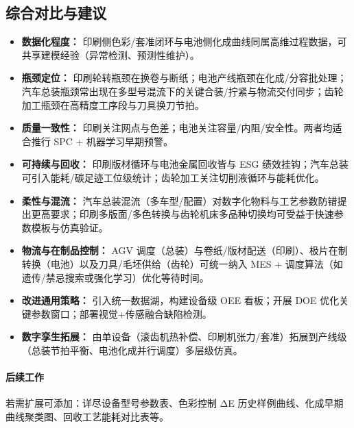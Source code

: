 \subsection{综合对比与建议}
\begin{itemize}
	\item \textbf{数据化程度：} 印刷侧色彩/套准闭环与电池侧化成曲线同属高维过程数据，可共享建模经验（异常检测、预测性维护）。
	\item \textbf{瓶颈定位：} 印刷轮转瓶颈在换卷与断纸；电池产线瓶颈在化成/分容批处理；汽车总装瓶颈常出现在多型号混流下的关键合装/拧紧与物流交付同步；齿轮加工瓶颈在高精度工序段与刀具换刀节拍。
	\item \textbf{质量一致性：} 印刷关注网点与色差；电池关注容量/内阻/安全性。两者均适合推行 SPC + 机器学习早期预警。
	\item \textbf{可持续与回收：} 印刷版材循环与电池金属回收皆与 ESG 绩效挂钩；汽车总装可引入能耗/碳足迹工位级统计；齿轮加工关注切削液循环与能耗优化。
	\item \textbf{柔性与混流：} 汽车总装混流（多车型/配置）对数字化物料与工艺参数防错提出更高要求；印刷多版面/多色转换与齿轮机床多品种切换均可受益于快速参数模板与仿真验证。
	\item \textbf{物流与在制品控制：} AGV 调度（总装）与卷纸/版材配送（印刷）、极片在制转换（电池）以及刀具/毛坯供给（齿轮）可统一纳入 MES + 调度算法（如遗传/禁忌搜索或强化学习）优化等待时间。
	\item \textbf{改进通用策略：} 引入统一数据湖，构建设备级 OEE 看板；开展 DOE 优化关键参数窗口；部署视觉+传感融合缺陷检测。
	\item \textbf{数字孪生拓展：} 由单设备（滚齿机热补偿、印刷机张力/套准）拓展到产线级（总装节拍平衡、电池化成并行调度）多层级仿真。
\end{itemize}

\paragraph{后续工作} 若需扩展可添加：详尽设备型号参数表、色彩控制 ΔE 历史样例曲线、化成早期曲线聚类图、回收工艺能耗对比表等。
